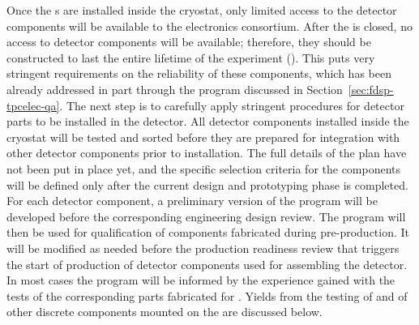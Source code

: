 Once the s are installed inside the cryostat, only
limited access to the detector components will be available to the  electronics
consortium. After the  is closed, no access to detector
components will be available; therefore, they should be constructed to
last the entire lifetime of the experiment (\dunelifetime). This
puts very stringent requirements on the reliability of these
components, which has been already addressed in part through 
the  program discussed in Section~\ref{sec:fdsp-tpcelec-qa}. The
next step is to carefully apply stringent  procedures for  
detector parts to be installed in the detector.
All detector components installed inside the cryostat will
be tested and sorted before they are prepared for integration
with other detector components prior to installation. The full
details of the  plan have not been put in place
yet, and the specific selection criteria for the components will
be defined only after the current design and
prototyping phase is completed. For each detector component, a preliminary
version of the  program will be developed before the corresponding 
engineering design review. The program will then be used for
qualification of components fabricated during 
pre-production. It will be modified as needed before the production
readiness review that triggers the start of production of detector components
used for assembling the detector. In most cases the  program
will be informed by the experience gained with the tests of the corresponding
parts fabricated for . Yields from the testing of 
and of other discrete components mounted on the  are discussed 
below. 

